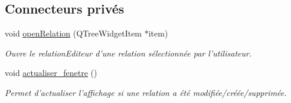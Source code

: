 \subsection*{Connecteurs privés}
\begin{DoxyCompactItemize}
\item 
void \hyperlink{class_vue_secondaire_af939340a1323aa49d52333b7f49d8e64}{open\-Relation} (Q\-Tree\-Widget\-Item $\ast$item)
\begin{DoxyCompactList}\small\item\em Ouvre le relation\-Editeur d'une relation sélectionnée par l'utilisateur. \end{DoxyCompactList}\item 
\hypertarget{class_vue_secondaire_a18dd8554d253c1c2c17a03c416c45d92}{void \hyperlink{class_vue_secondaire_a18dd8554d253c1c2c17a03c416c45d92}{actualiser\-\_\-fenetre} ()}\label{class_vue_secondaire_a18dd8554d253c1c2c17a03c416c45d92}

\begin{DoxyCompactList}\small\item\em Permet d'actualiser l'affichage si une relation a été modifiée/créée/supprimée. \end{DoxyCompactList}\end{DoxyCompactItemize}

